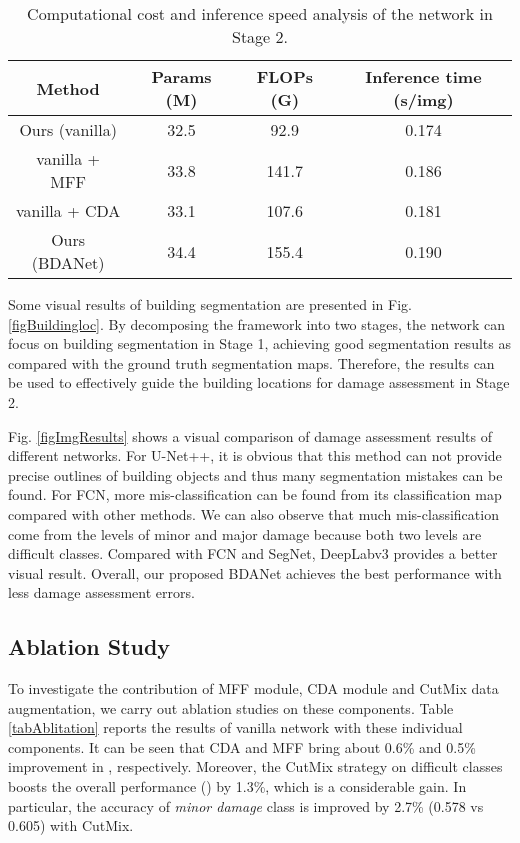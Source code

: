 \documentclass[journal]{IEEEtran}
\begin{document}
\begin{table}[!t]
	\centering
	\caption{Computational cost and inference speed analysis of the network in Stage 2.}
	\setlength{\tabcolsep}{1.15mm} {
	\begin{tabular}{c|ccc}
		\hline \hline
    \textbf{Method}     & Params (M)   & FLOPs (G)  & Inference time (s/img) \\
    \hline
     Ours (vanilla)  & 32.5  & 92.9  &0.174\\
     vanilla + MFF & 33.8 & 141.7  & 0.186\\
     vanilla + CDA    & 33.1  &  107.6  &0.181  \\
     Ours (BDANet) & 34.4 & 155.4 & 0.190\\
	\hline
	\end{tabular}}
\label{tabParam}
\end{table}

Some visual results of building segmentation are presented in Fig. \ref{figBuildingloc}. By decomposing the framework into two stages, the network can focus on building segmentation in Stage 1, achieving good segmentation results as compared with the ground truth segmentation maps. 
Therefore, the results can be used to effectively guide the building locations for damage assessment in Stage 2.

Fig. \ref{figImgResults} shows a visual comparison of damage assessment results of different networks. For U-Net++, it is obvious that this method can not provide precise outlines of building objects and thus many segmentation mistakes can be found. For FCN, more mis-classification can be found from its classification map compared with other methods. We can also observe that much mis-classification come from the levels of minor  and major damage because both two levels are difficult classes. Compared with FCN and SegNet, DeepLabv3 provides a better visual result. Overall, our proposed BDANet achieves the best performance with less damage assessment errors. 



\subsection{Ablation Study}
To investigate the contribution of MFF module, CDA module and CutMix data augmentation, we carry out ablation studies on these components. Table \ref{tabAblitation} reports the results of vanilla network with these individual components. It can be seen that CDA and MFF bring about 0.6\% and 0.5\% improvement in , respectively.  Moreover, the CutMix strategy on difficult classes boosts the overall performance () by 1.3\%, which is a considerable gain. In particular, the accuracy of \textit{minor damage} class is improved by 2.7\% (0.578 vs 0.605) with CutMix. 
\end{document}
